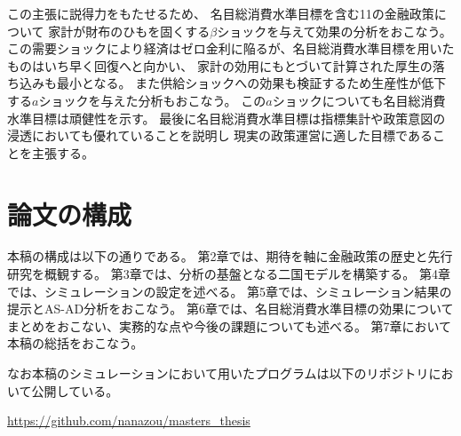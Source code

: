 この主張に説得力をもたせるため、
名目総消費水準目標を含む11の金融政策について
家計が財布のひもを固くする\(\beta\)ショックを与えて効果の分析をおこなう。
この需要ショックにより経済はゼロ金利に陥るが、名目総消費水準目標を用いたものはいち早く回復へと向かい、
家計の効用にもとづいて計算された厚生の落ち込みも最小となる。
また供給ショックへの効果も検証するため生産性が低下する\(a\)ショックを与えた分析もおこなう。
この\(a\)ショックについても名目総消費水準目標は頑健性を示す。
最後に名目総消費水準目標は指標集計や政策意図の浸透においても優れていることを説明し
現実の政策運営に適した目標であることを主張する。

\section{論文の構成}
\label{sec:intro_structure}
本稿の構成は以下の通りである。
第2章では、期待を軸に金融政策の歴史と先行研究を概観する。
第3章では、分析の基盤となる二国モデルを構築する。
第4章では、シミュレーションの設定を述べる。
第5章では、シミュレーション結果の提示とAS-AD分析をおこなう。
第6章では、名目総消費水準目標の効果についてまとめをおこない、実務的な点や今後の課題についても述べる。
第7章において本稿の総括をおこなう。

なお本稿のシミュレーションにおいて用いたプログラムは以下のリポジトリにおいて公開している。

\url{https://github.com/nanazou/masters_thesis}